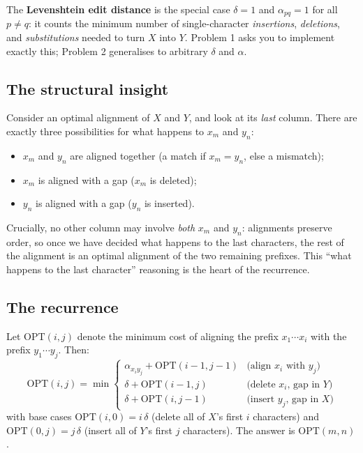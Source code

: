 \documentclass[11pt]{article}
\begin{document}
The \textbf{Levenshtein edit distance} is the special case $\delta = 1$ and
$\alpha_{pq} = 1$ for all $p \ne q$: it counts the minimum number of single-character
\emph{insertions}, \emph{deletions}, and \emph{substitutions} needed to turn $X$ into $Y$.
Problem 1 asks you to implement exactly this; Problem 2 generalises to arbitrary $\delta$
and $\alpha$.

\subsection{The structural insight}

Consider an optimal alignment of $X$ and $Y$, and look at its \emph{last} column. There are
exactly three possibilities for what happens to $x_m$ and $y_n$:
\begin{itemize}
    \item $x_m$ and $y_n$ are aligned together (a match if $x_m = y_n$, else a mismatch);
    \item $x_m$ is aligned with a gap ($x_m$ is deleted);
    \item $y_n$ is aligned with a gap ($y_n$ is inserted).
\end{itemize}
Crucially, no other column may involve \emph{both} $x_m$ and $y_n$: alignments preserve
order, so once we have decided what happens to the last characters, the rest of the
alignment is an optimal alignment of the two remaining prefixes. This ``what happens to the
last character'' reasoning is the heart of the recurrence.

\subsection{The recurrence}

Let $\mathrm{OPT}(i,j)$ denote the minimum cost of aligning the prefix $x_1 \cdots x_i$
with the prefix $y_1 \cdots y_j$. Then:
\[
\mathrm{OPT}(i,j) = \min
\begin{cases}
\alpha_{x_i y_j} + \mathrm{OPT}(i-1, j-1) & \text{(align $x_i$ with $y_j$)}\\[2pt]
\delta + \mathrm{OPT}(i-1, j) & \text{(delete $x_i$, gap in $Y$)}\\[2pt]
\delta + \mathrm{OPT}(i, j-1) & \text{(insert $y_j$, gap in $X$)}
\end{cases}
\]
with base cases $\mathrm{OPT}(i, 0) = i\,\delta$ (delete all of $X$'s first $i$ characters)
and $\mathrm{OPT}(0, j) = j\,\delta$ (insert all of $Y$'s first $j$ characters). The answer
is $\mathrm{OPT}(m, n)$.
\end{document}
